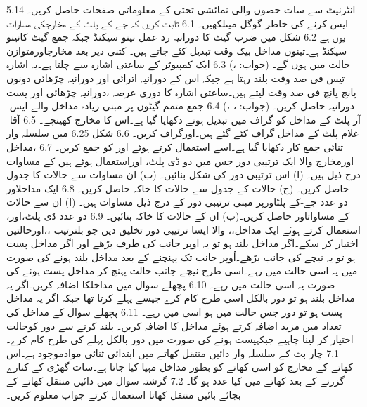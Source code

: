 5.14	انٹرنیٹ سے سات حصوں والی نمائشی تختی کے معلوماتی صفحات حاصل کریں۔ایس کرنے کی خاطر گوگل میںلکھیں۔
6.1	ثابت کریں کہ جے-کے پلٹ کے مخارجکی مساوات 	یوں ہے
6.2	شکل میں ضرب گیٹ کا دورانیہ رد عمل نینو سیکنڈ جبکہ جمع گیٹ کانینو سیکنڈ ہے۔تینوں مداخل بیک وقت  تبدیل کئے جاتے ہیں۔  کتنی دیر بعد مخارجاورمتوازن حالت میں ہوں گے۔ (جواب: ،)
6.3	ایک کمپیوٹر کے ساعتی اشارہ سے چلتا ہے۔یہ اشارہ تیس فی صد وقت بلند رہتا ہے جبکہ اس کے دورانیہ اترائی اور دورانیہ چڑھائی دونوں پانچ پانچ فی صد وقت لیتے ہیں۔ساعتی اشارہ کا دوری عرصہ ،دورانیہ چڑھائی اور پست دورانیہ حاصل کریں۔ (جواب: ، ،)
           6.4	جمع متمم گیٹوں پر مبنی زیادہ مداخل والے ایس-آر پلٹ کے مداخل کو گراف میں تبدیل ہوتے دکھایا گیا ہے۔اس کا مخارج کھینچے۔
6.5	آقا-غلام پلٹ کے مداخل گراف کئے گئے ہیں۔اورگراف کریں۔
6.6	شکل 6.25 میں سلسلہ وار ثنائی جمع کار دکھایا گیا ہے۔اسے استعمال کرتے ہوئے اور کو جمع کریں۔
6.7	،مداخل اورمخارج والا ایک ترتیبی دور جس میں دو ڈی پلٹ، اوراستعمال ہوئے ہیں کے مساوات درج ذیل ہیں۔
(ا) اس ترتیبی دور کی شکل بنائیں۔ (ب) ان مساوات سے حالات کا جدول حاصل کریں۔ (ج) حالات کے جدول سے حالات کا خاکہ حاصل کریں۔
6.8	ایک مداخلاور دو عدد جے-کے پلٹاورپر مبنی ترتیبی دور کے درج ذیل مساوات ہیں۔
(ا) ان سے حالات کے مساواتاور حاصل کریں۔(ب) ان کے حالات کا خاکہ بنائیں۔
6.9	دو عدد ڈی پلٹ،اور، استعمال کرتے ہوئے ایک مداخل،، والا ایسا ترتیبی دور تخلیق دیں جو بلترتیب  ،،اورحالتیں اختیار کر سکے۔اگر مداخل بلند ہو تو یہ اوپر جانب کی طرف بڑھے اور اگر مداخل پست ہو تو یہ نیچے کی جانب بڑھے۔اُوپر جانب تک پہنچنے کے بعد مداخل بلند ہونے کی صورت میں یہ اسی حالت میں رہے۔اسی طرح نیچے جانب حالت پہنچ کر مداخل پست ہونے کی صورت یہ اسی حالت میں رہے۔
6.10	پچھلے سوال میں مداخلکا اضافہ کریں۔اگر یہ مداخل بلند ہو تو دور بالکل اسی طرح کام کرے جیسے پہلے کرتا تھا جبکہ اگر یہ مداخل پست ہو تو دور جس حالت میں ہو اسی میں رہے۔
6.11	پچھلے سوال کے مداخل کی تعداد میں مزید اضافہ کرتے ہوئے مداخل کا اضافہ کریں۔ بلند کرنے سے دور کوحالت اختیار کر لینا چاہیے جبکہپست ہونے کی صورت میں دور بالکل پہلے کی طرح کام کرے۔
7.1	چار بٹ کے سلسلہ وار دائیں منتقل کھاتے میں ابتدائی ثنائی موادموجود ہے۔اس کھاتے کے مخارج کو اسی کھاتے کو بطور مداخل مہیا کیا جاتا ہے۔سات گھڑی کے کنارے گزرنے کے بعد کھاتے میں کیا عدد ہو گا۔
7.2	 گزشتہ سوال میں دائیں منتقل کھاتے کے بجائے بائیں منتقل کھاتا استعمال کرتے جواب معلوم کریں۔

